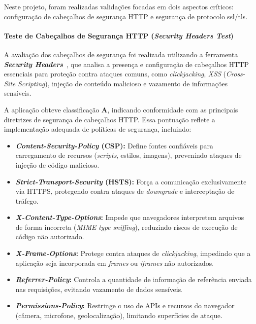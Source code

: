 Neste projeto, foram realizadas validações focadas em dois aspectos críticos: configuração de cabeçalhos de segurança HTTP e segurança de protocolo \gls{ssl}/\gls{tls}.

\paragraph{Teste de Cabeçalhos de Segurança HTTP (\textit{Security Headers Test})}
A avaliação dos cabeçalhos de segurança foi realizada utilizando a ferramenta \textbf{\textit{Security Headers}}~\cite{securityheaders-2025}, 
que analisa a presença e configuração de cabeçalhos HTTP essenciais para proteção contra ataques comuns, como \textit{clickjacking}, \textit{XSS} (\textit{Cross-Site Scripting}), injeção de conteúdo malicioso e vazamento de informações sensíveis.

A aplicação obteve classificação \textbf{A}, indicando conformidade com as principais diretrizes de segurança de cabeçalhos HTTP. 
Essa pontuação reflete a implementação adequada de políticas de segurança, incluindo:

\begin{itemize}
	\item \textbf{\textit{Content-Security-Policy} (CSP):} Define fontes confiáveis para carregamento de recursos (\textit{scripts}, estilos, imagens), 
	prevenindo ataques de injeção de código malicioso.
	\item \textbf{\textit{Strict-Transport-Security} (HSTS):} Força a comunicação exclusivamente via HTTPS, protegendo contra ataques de \textit{downgrade} e interceptação de tráfego.
	\item \textbf{\textit{X-Content-Type-Options}:} Impede que navegadores interpretem arquivos de forma incorreta (\textit{MIME type sniffing}), reduzindo riscos de execução de código não autorizado.
	\item \textbf{\textit{X-Frame-Options}:} Protege contra ataques de \textit{clickjacking}, impedindo que a aplicação seja incorporada em \textit{frames} ou \textit{iframes} não autorizados.
	\item \textbf{\textit{Referrer-Policy}:} Controla a quantidade de informação de referência enviada nas requisições, evitando vazamento de dados sensíveis.
	\item \textbf{\textit{Permissions-Policy}:} Restringe o uso de APIs e recursos do navegador (câmera, microfone, geolocalização), limitando superfícies de ataque.
\end{itemize}

